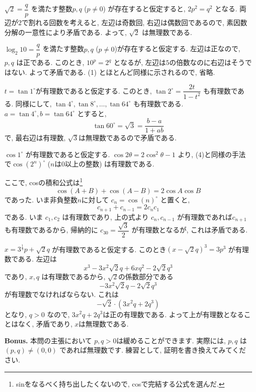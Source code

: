 $\sqrt{2} = \dfrac{q}{p}$ を満たす整数$p,q$ ($p\neq 0$) が存在すると仮定すると,
$2p^2 = q^2$ となる. 両辺が$2$で割れる回数を考えると, 左辺は奇数回, 右辺は偶数回であるので, 素因数分解の一意性により矛盾である.
よって, $\sqrt{2}$ は無理数である.

$\log_{2}{10} = \dfrac{q}{p}$ を満たす整数$p,q$ ($p\neq 0$)が存在すると仮定する.
左辺は正なので, $p,q$ は正である.
このとき, $10^p = 2^q$ となるが, 左辺は$5$の倍数なのに右辺はそうではない. よって矛盾である.
(1) とほとんど同様に示されるので, 省略.

$t = \tan{1^{\circ}}$が有理数であると仮定する. このとき,
$\tan{2^{\circ}} = \dfrac{2t}{1-t^2}$ も有理数である.
同様にして,
$\tan{4^{\circ}}, \tan{8^{\circ}}, \dots, \tan{64^{\circ}}$ も有理数である.
$a = \tan{4^{\circ}}, b = \tan{64^{\circ}}$ とすると,
$$
\tan{60^{\circ}} = \sqrt{3} = \dfrac{b-a}{1+ab}
$$
で, 最右辺は有理数, $\sqrt{3}$は無理数であるので矛盾である.

$\cos{1^{\circ}}$ が有理数であると仮定する.
$\cos{2\theta} = 2\cos^{2}{\theta} - 1$ より,
(4)と同様の手法で$\cos{(2^n)^{\circ}}$ ($n$は0以上の整数) は有理数である.

ここで, cosの積和公式は\footnote{sinをなるべく持ち出したくないので, cosで完結する公式を選んだ. }
$$
\cos{(A+B)} + \cos{(A-B)} = 2\cos{A}\cos{B}
$$
であった. いま非負整数$n$に対して $c_n = \cos{(n)^{\circ}}$ と置くと,
$$
c_{n+1} + c_{n-1} = 2c_n c_1
$$
である.
いま $c_1, c_2$ は有理数であり, 上の式より $c_{n}, c_{n-1}$ が有理数であれば$c_{n+1}$も有理数であるから, 帰納的に
$c_{30} = \dfrac{\sqrt{3}}{2}$ が有理数となるが, これは矛盾である.

$x = 3^{\frac{1}{3}}p+\sqrt{2}q$ が有理数であると仮定する.
このとき$(x - \sqrt{2}q)^3 = 3p^3$ が有理数である. 左辺は
$$
x^3 - 3x^2\sqrt{2}q + 6xq^2 -2\sqrt{2}q^3
$$
であり, $x,q$ は有理数であるから, $\sqrt{2}$の係数部分である
$$
-3x^2\sqrt{2}q - 2\sqrt{2} q^3
$$
が有理数でなければならない.
これは
$$
-\sqrt{2}\cdot (3x^2q + 2q^3)
$$
となり, $q>0$ なので, $3x^2q + 2q^3$は正の有理数である.
よって上が有理数となることはなく, 矛盾であり, $x$は無理数である.

\noindent\textbf{Bonus.} 本問の主張において $p, q>0$は緩めることができます. 実際には,
$p, q$ は $(p,q)\neq (0,0)$ であれば無理数です.
練習として, 証明を書き換えてみてください.